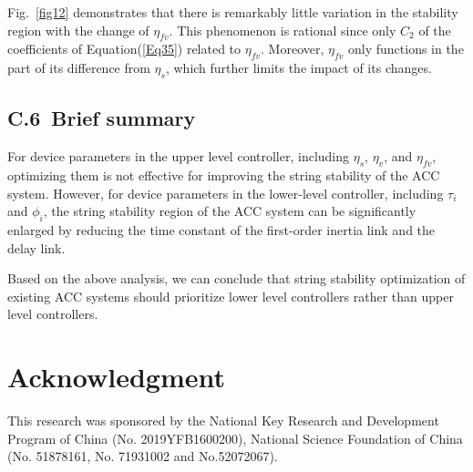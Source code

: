 \documentclass[a4paper]{cas-sc}
\begin{document}
Fig.~\ref{fig12} demonstrates that there is remarkably little variation in the stability region with the change of $\eta_{fv}$. This phenomenon is rational since only $C_2$ of the coefficients of Equation(\ref{Eq35}) related to $\eta_{fv}$. Moreover, $\eta_{fv}$ only functions in the part of its difference from $\eta_s$, which further limits the impact of its changes.

\subsection*{C.6~Brief summary}

For device parameters in the upper level controller, including $\eta_s$, $\eta_v$, and $\eta_{fv}$, optimizing them is not effective for improving the string stability of the ACC system. However, for device parameters in the lower-level controller, including $\tau_i$ and $\phi_i$, the string stability region of the ACC system can be significantly enlarged by reducing the time constant of the first-order inertia link and the delay link.

Based on the above analysis, we can conclude that string stability optimization of existing ACC systems should prioritize lower level controllers rather than upper level controllers.


\afterpage{\clearpage}

\printcredits

\section*{Acknowledgment}

This research was sponsored by the National Key Research and Development Program of China (No. 2019YFB1600200), National Science Foundation of China (No. 51878161, No. 71931002 and No.52072067).

% 





\end{document}
